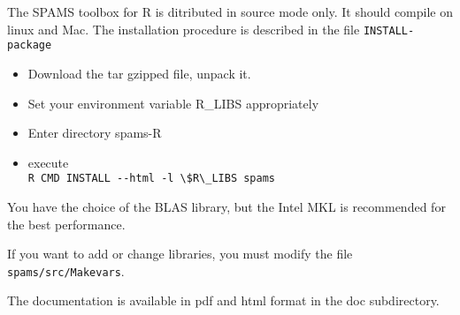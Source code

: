 The SPAMS toolbox for R is ditributed in source mode only.
It should compile on linux and Mac.
The installation procedure is described in the file \verb=INSTALL-package=
\begin{itemize}
\item Download the tar gzipped file, unpack it.
\item Set your environment variable R\_LIBS appropriately
\item Enter directory spams-R
\item execute \\
  \verb=R CMD INSTALL --html -l \$R\_LIBS spams=
\end{itemize}

You have the choice of the BLAS library, but the Intel 
MKL is recommended for the best performance.

If you want to add or change libraries, you must modify
the file \verb=spams/src/Makevars=.

The documentation is available in pdf and html format in the doc subdirectory.
